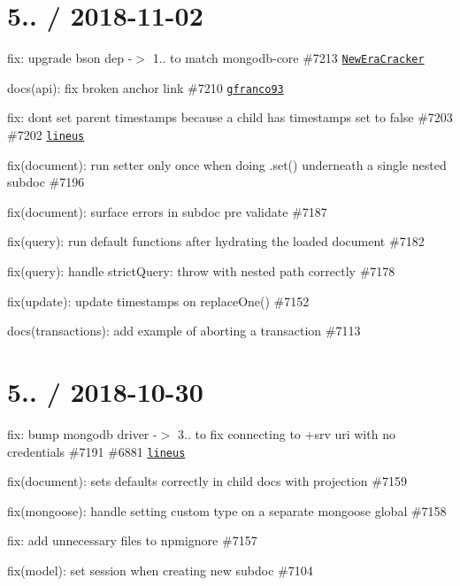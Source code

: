 \section*{5.. / 2018-\/11-\/02 }


\begin{DoxyItemize}
\item fix\+: upgrade bson dep -\/$>$ 1.. to match mongodb-\/core \#7213 \href{https://github.com/NewEraCracker}{\tt New\+Era\+Cracker}
\item docs(api)\+: fix broken anchor link \#7210 \href{https://github.com/gfranco93}{\tt gfranco93}
\item fix\+: don\textquotesingle{}t set parent timestamps because a child has timestamps set to false \#7203 \#7202 \href{https://github.com/lineus}{\tt lineus}
\item fix(document)\+: run setter only once when doing {\ttfamily .set()} underneath a single nested subdoc \#7196
\item fix(document)\+: surface errors in subdoc pre validate \#7187
\item fix(query)\+: run default functions after hydrating the loaded document \#7182
\item fix(query)\+: handle strict\+Query\+: \textquotesingle{}throw\textquotesingle{} with nested path correctly \#7178
\item fix(update)\+: update timestamps on replace\+One() \#7152
\item docs(transactions)\+: add example of aborting a transaction \#7113
\end{DoxyItemize}

\section*{5.. / 2018-\/10-\/30 }


\begin{DoxyItemize}
\item fix\+: bump mongodb driver -\/$>$ 3.. to fix connecting to +srv uri with no credentials \#7191 \#6881 \href{https://github.com/lineus}{\tt lineus}
\item fix(document)\+: sets defaults correctly in child docs with projection \#7159
\item fix(mongoose)\+: handle setting custom type on a separate mongoose global \#7158
\item fix\+: add unnecessary files to npmignore \#7157
\item fix(model)\+: set session when creating new subdoc \#7104
\end{DoxyItemize}


